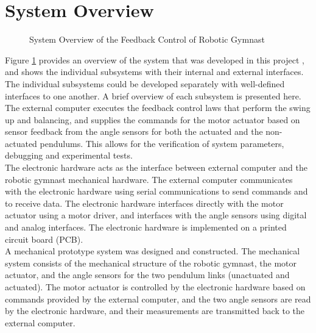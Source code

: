 \section{System Overview}
\label{sec:system_overview}
\begin{figure}[h]
	\centering
	
	\caption{System Overview of the Feedback Control of Robotic Gymnast}
	\label{fig:system_overview}
\end{figure}


Figure \ref{fig:system_overview}  provides an overview of the system that was developed in this project , and shows the individual subsystems with their internal and external interfaces. The individual subsystems could be developed separately with well-defined interfaces to one another. A brief overview of each subsystem is presented here.\\

The external computer executes the feedback control laws that perform the swing up and balancing, and supplies the commands for the motor actuator based on sensor feedback from the angle sensors for both the actuated and the non-actuated pendulums. This allows for the verification of system parameters, debugging and experimental tests.\\

The electronic hardware acts as the interface between external computer and the robotic gymnast mechanical hardware. The external computer communicates with the electronic hardware using serial communications to send commands and to receive data. The electronic hardware interfaces directly with the motor actuator using a motor driver, and interfaces with the angle sensors using digital and analog interfaces. The electronic hardware is implemented on a printed circuit board (PCB).\\

A mechanical prototype system was designed and constructed. The mechanical system consists of the mechanical structure of the robotic gymnast, the motor actuator, and the angle sensors for the two pendulum links (unactuated and actuated). The motor actuator is controlled by the electronic hardware based on commands provided by the external computer, and the two angle sensors are read by the electronic hardware, and their measurements are transmitted back to the external computer.\\

